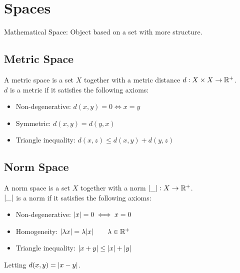 \chapter{Spaces}
Mathematical Space: Object based on a set with more structure.
\section{Metric Space}
A metric space is a set $X$ together with a metric distance $d: X \times X \to \mathbb{R}^+$.\\
$d$ is a metric if it satisfies the following axioms:
\begin{itemize}
	\item Non-degenerative: $d(x,y)=0 \iff x=y$
	\item Symmetric: $d(x,y) = d(y,x)$
	\item Triangle inequality: $d(x,z) \leq d(x,y) + d(y,z)$
\end{itemize}

\section{Norm Space}
A norm space is a set $X$ together with a norm $| \_ |: X \to \mathbb{R}^+$.\\
$| \_ |$ is a norm if it satisfies the following axioms:
\begin{itemize}
	\item Non-degenerative: $| x |=0 \iff x=0$
	\item Homogeneity: $| \lambda x | = \lambda | x | \qquad \lambda \in \mathbb{R}^+$
	\item Triangle inequality: $| x+y | \leq | x | + | y |$
\end{itemize}
\begin{property}
	Letting $d(x,y) = | x-y |$.
\end{property}

